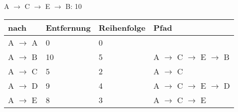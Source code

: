 \documentclass{lehramt-informatik-aufgabe}
\begin{document}
\begin{enumerate}
\begin{liAntwort}
A $\rightarrow$ C $\rightarrow$ E $\rightarrow$ B: 10

\begin{tabular}{llll}
\bf{nach}                                         & \bf{Entfernung}                                   & \bf{Reihenfolge}                                  & \bf{Pfad}                                         \\
\hline
A  $\rightarrow$  A                               & 0                                                 & 0                                                 &                                                   \\
A  $\rightarrow$  B                               & 10                                                & 5                                                 & A $\rightarrow$ C $\rightarrow$ E $\rightarrow$ B \\
A  $\rightarrow$  C                               & 5                                                 & 2                                                 & A $\rightarrow$ C                                 \\
A  $\rightarrow$  D                               & 9                                                 & 4                                                 & A $\rightarrow$ C $\rightarrow$ E $\rightarrow$ D \\
A  $\rightarrow$  E                               & 8                                                 & 3                                                 & A $\rightarrow$ C $\rightarrow$ E                 \\
\end{tabular}

\end{liAntwort}
\end{enumerate}
\end{document}
